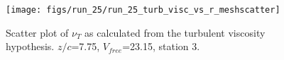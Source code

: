 \begin{figure}[H]
\centering
\texttt{[image: figs/run\_25/run\_25\_turb\_visc\_vs\_r\_meshscatter]}
\caption{Scatter plot of $\nu_T$ as calculated from the turbulent viscosity hypothesis. $z/c$=7.75, $V_{free}$=23.15, station 3.}
\label{fig:run_25_turb_visc_vs_r_meshscatter}
\end{figure}



